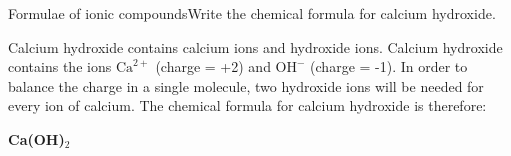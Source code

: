 \begin{wex}{Formulae of ionic compounds}{Write the chemical formula for calcium hydroxide.\\}
{
Calcium hydroxide contains calcium ions and hydroxide ions.
Calcium hydroxide contains the ions $\mathrm{Ca}^{2+}$ (charge = +2) and $\mathrm{OH}^{-}$ (charge = -1). In order to balance the charge in a single molecule, two hydroxide ions will be needed for every ion of calcium. 
The chemical formula for calcium hydroxide is therefore: 

\begin{center}
\textbf{Ca(OH)$_2$}
\end{center}}
\end{wex}
    \noindent
	\par
      \label{m38689*secfhsst!!!underscore!!!id822}
